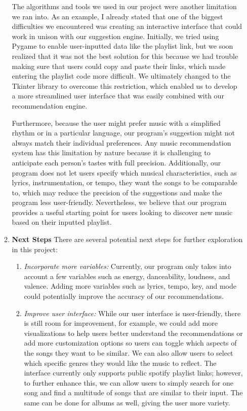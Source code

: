 \documentclass[fontsize=11pt]{article}
\begin{document}
\begin{enumerate}
\begin{enumerate}
    The algorithms and tools we used in our project were another limitation we ran into. As an example, I already stated that one of the biggest difficulties we encountered was creating an interactive interface that could work in unison with our suggestion engine. Initially, we tried using Pygame to enable user-inputted data like the playlist link, but we soon realized that it was not the best solution for this because we had trouble making sure that users could copy and paste their links, which made entering the playlist code more difficult. We ultimately changed to the Tkinter library to overcome this restriction, which enabled us to develop a more streamlined user interface that was easily combined with our recommendation engine. \newline

    Furthermore, because the user might prefer music with a simplified rhythm or in a particular language, our program's suggestion might not always match their individual preferences. Any music recommendation system has this limitation by nature because it is challenging to anticipate each person's tastes with full precision. Additionally, our program does not let users specify which musical characteristics, such as lyrics, instrumentation, or tempo, they want the songs to be comparable to, which may reduce the precision of the suggestions and make the program less user-friendly. Nevertheless, we believe that our program provides a useful starting point for users looking to discover new music based on their inputted playlist. \newline

    \item\textbf{Next Steps} \newline
    There are several potential next steps for further exploration in this project: \\
    \begin{enumerate}
        \item \emph{Incorporate more variables:} Currently, our program only takes into account a few variables such as energy, danceability, loudness, and valence. Adding more variables such as lyrics, tempo, key, and mode could potentially improve the accuracy of our recommendations.\\
        
        \item \emph{Improve user interface:} While our user interface is user-friendly, there is still room for improvement, for example, we could add more visualizations to help users better understand the recommendations or add more customization options so users can toggle which aspects of the songs they want to be similar. We can also allow users to select which specific genres they would like the music to reflect. The interface currently only supports public spotify playlist links; however, to further enhance this, we can allow users to simply search for one song and find a multitude of songs that are similar to their input. The same can be done for albums as well, giving the user more variety. \\
        

\end{enumerate}
\end{enumerate}
\end{enumerate}
\end{document}
